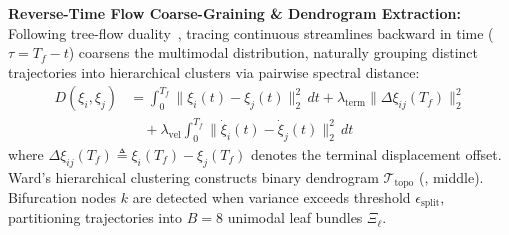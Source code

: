 \documentclass{sice-si}
\begin{document}
\textbf{Reverse-Time Flow Coarse-Graining \& Dendrogram Extraction:}
Following tree-flow duality~\cite{ramachandran2026trees}, tracing continuous streamlines backward in time ($\tau = T_f - t$) coarsens the multimodal distribution, naturally grouping distinct trajectories into hierarchical clusters via pairwise spectral distance:
\begin{align}
    D(\xi_i, \xi_j) &= \int_0^{T_f} \|\xi_i(t) - \xi_j(t)\|_2^2 \, dt + \lambda_{\text{term}} \|\Delta \xi_{ij}(T_f)\|_2^2 \nonumber \\
    &\quad + \lambda_{\text{vel}} \int_0^{T_f} \|\dot{\xi}_i(t) - \dot{\xi}_j(t)\|_2^2 \, dt
\end{align}
where $\Delta \xi_{ij}(T_f) \triangleq \xi_i(T_f) - \xi_j(T_f)$ denotes the terminal displacement offset. Ward's hierarchical clustering constructs binary dendrogram $\mathcal{T}_{\text{topo}}$ (, middle). Bifurcation nodes $k$ are detected when variance exceeds threshold $\epsilon_{\text{split}}$, partitioning trajectories into $B=8$ unimodal leaf bundles $\Xi_\ell$.
\end{document}
